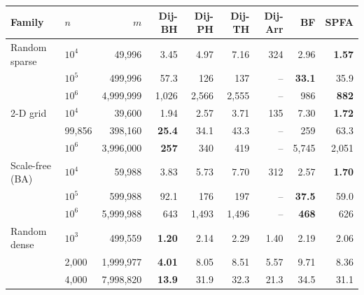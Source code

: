\begin{tabular}{llrrrrrrr}
\toprule
Family & $n$ & $m$ & Dij-BH & Dij-PH & Dij-TH & Dij-Arr & BF & SPFA \\
\midrule
Random sparse & $10^4$ & 49{,}996 & 3.45 & 4.97 & 7.16 & 324 & 2.96 & \textbf{1.57} \\
 & $10^5$ & 499{,}996 & 57.3 & 126 & 137 & -- & \textbf{33.1} & 35.9 \\
 & $10^6$ & 4{,}999{,}999 & 1{,}026 & 2{,}566 & 2{,}555 & -- & 986 & \textbf{882} \\
\midrule
2-D grid & $10^4$ & 39{,}600 & 1.94 & 2.57 & 3.71 & 135 & 7.30 & \textbf{1.72} \\
 & 99{,}856 & 398{,}160 & \textbf{25.4} & 34.1 & 43.3 & -- & 259 & 63.3 \\
 & $10^6$ & 3{,}996{,}000 & \textbf{257} & 340 & 419 & -- & 5{,}745 & 2{,}051 \\
\midrule
Scale-free (BA) & $10^4$ & 59{,}988 & 3.83 & 5.73 & 7.70 & 312 & 2.57 & \textbf{1.70} \\
 & $10^5$ & 599{,}988 & 92.1 & 176 & 197 & -- & \textbf{37.5} & 59.0 \\
 & $10^6$ & 5{,}999{,}988 & 643 & 1{,}493 & 1{,}496 & -- & \textbf{468} & 626 \\
\midrule
Random dense & $10^3$ & 499{,}559 & \textbf{1.20} & 2.14 & 2.29 & 1.40 & 2.19 & 2.06 \\
 & 2{,}000 & 1{,}999{,}977 & \textbf{4.01} & 8.05 & 8.51 & 5.57 & 9.71 & 8.36 \\
 & 4{,}000 & 7{,}998{,}820 & \textbf{13.9} & 31.9 & 32.3 & 21.3 & 34.5 & 31.1 \\
\bottomrule
\end{tabular}
